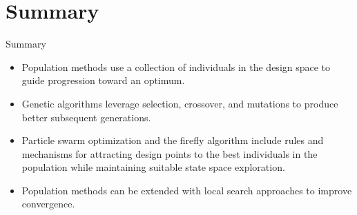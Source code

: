 \documentclass{beamer}
\begin{document}
\section{Summary}
\begin{frame}{Summary}
    \begin{itemize}
        \item Population methods use a collection of individuals in the design space to guide progression toward an optimum.
        \item Genetic algorithms leverage selection, crossover, and mutations to produce better subsequent generations.
        \item Particle swarm optimization and the firefly algorithm include rules and mechanisms for attracting design points to the best individuals in the population while maintaining suitable state space exploration.
        \item Population methods can be extended with local search approaches to improve convergence.
    \end{itemize}
\end{frame}
\end{document}
